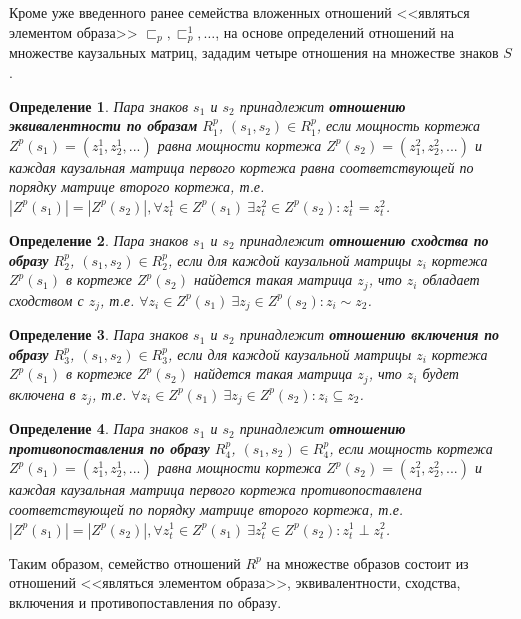 \documentclass[12pt]{scrartcl}
\newtheorem{definition}{Определение}
\begin{document}
	Кроме уже введенного ранее семейства вложенных отношений <<являться элементом образа>> ${\sqsubset_p,\sqsubset_p^1,\dots}$, на основе определений отношений на множестве каузальных матриц, зададим четыре отношения на множестве знаков $S$.
	\begin{definition}
		Пара знаков  $s_1$ и $s_2$ принадлежит \textbf{отношению эквивалентности по образам} $R_1^p$, $(s_1,s_2)\in R_1^p$, если мощность кортежа $Z^p(s_1)=(z_1^1,z_2^1,...)$ равна мощности кортежа $Z^p(s_2)=(z_1^2,z_2^2,...)$ и каждая каузальная матрица первого кортежа равна соответствующей по порядку матрице второго кортежа, т.е. $|Z^p(s_1)| = |Z^p(s_2)|, \forall z_t^1\in Z^p(s_1)\ \exists z_t^2\in Z^p(s_2): z_t^1=z_t^2$.
	\end{definition}
	
	\begin{definition}\label{def:sim}
		Пара знаков  $s_1$ и $s_2$ принадлежит \textbf{отношению сходства по образу} $R_2^p$, $(s_1,s_2)\in R_2^p$, если для каждой каузальной матрицы $z_i$ кортежа $Z^p(s_1)$ в кортеже $Z^p(s_2)$ найдется такая матрица $z_j$, что $z_i$ обладает сходством с $z_j$, т.е. $\forall z_i\in Z^p(s_1)\ \exists z_j\in Z^p(s_2): z_i\sim z_2$.
	\end{definition}
	
	\begin{definition}
		Пара знаков  $s_1$ и $s_2$ принадлежит \textbf{отношению включения по образу} $R_3^p$, $(s_1,s_2)\in R_3^p$, если для каждой каузальной матрицы $z_i$ кортежа $Z^p(s_1)$ в кортеже $Z^p(s_2)$ найдется такая матрица $z_j$, что $z_i$ будет включена в $z_j$, т.е. $\forall z_i\in Z^p(s_1)\ \exists z_j\in Z^p(s_2): z_i\subseteq z_2$.
	\end{definition}

	\begin{definition}
		Пара знаков  $s_1$ и $s_2$ принадлежит \textbf{отношению противопоставления по образу} $R_4^p$, $(s_1,s_2)\in R_4^p$, если мощность кортежа $Z^p(s_1)=(z_1^1,z_2^1,...)$ равна мощности кортежа $Z^p(s_2)=(z_1^2,z_2^2,...)$ и каждая каузальная матрица первого кортежа противопоставлена соответствующей по порядку матрице второго кортежа, т.е. $|Z^p(s_1)| = |Z^p(s_2)|, \forall z_t^1\in Z^p(s_1)\ \exists z_t^2\in Z^p(s_2): z_t^1\perp z_t^2$.
	\end{definition}
	
	Таким образом, семейство отношений $R^p$ на множестве образов состоит из отношений <<являться элементом образа>>, эквивалентности, сходства, включения и противопоставления по образу.
		
\end{document}
